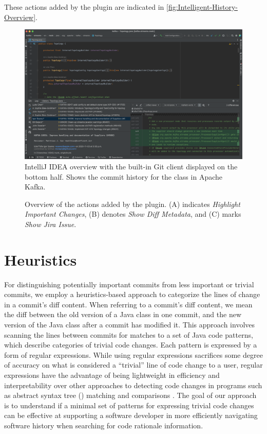 These actions added by the  plugin are indicated in \autoref{fig:Intelligent-History-Overview}.

\begin{figure}
    \includegraphics[width=\textwidth]{./images/intellij-overview.png}
    \caption{
        IntelliJ IDEA overview with the built-in Git client displayed on the bottom half. Shows the commit history for the  class in Apache Kafka.
    }
    \label{fig:IntelliJ-Overview}
\end{figure}

\begin{figure}
    \caption{Overview of the actions added by the  plugin. (A) indicates \textit{Highlight Important Changes}, (B) denotes \textit{Show Diff Metadata}, and (C) marks \textit{Show Jira Issue}.}
    \label{fig:Intelligent-History-Overview}
\end{figure}

\section{Heuristics}
\label{sec:Heuristics}

For distinguishing potentially important commits from less important or trivial commits, we employ a heuristics-based approach to categorize the lines of change in a commit's diff content.
When referring to a commit's diff content, we mean the diff between the old version of a Java class in one commit, and the new version of the Java class after a commit has modified it.
This approach involves scanning the lines between commits for matches to a set of Java code patterns, which describe categories of trivial code changes.
Each pattern is expressed by a form of regular expressions.
While using regular expressions sacrifices some degree of accuracy on what is considered a ``trivial'' line of code change to a user,
regular expressions have the advantage of being lightweight in efficiency and interpretability over other approaches to detecting code changes in programs such as abstract syntax tree () matching and comparisons \cite{murphy_lightweight_1996}.
The goal of our approach is to understand if a minimal set of patterns for expressing trivial code changes can be effective at supporting a software developer in more efficiently navigating software history when searching for code rationale information.

